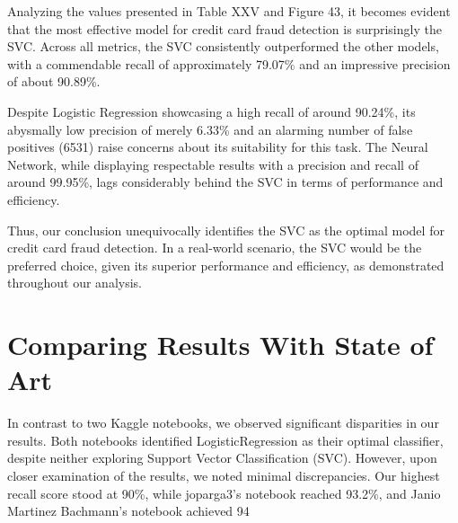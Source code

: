 \documentclass[conference]{IEEEtran}
\begin{document}
\begin{table}[H]
\centering
{}
\caption{Final Results}
\label{tab:svm-comparison}
\end{table}

Analyzing the values presented in Table XXV and Figure 43, it becomes evident that the most effective model for credit card fraud detection is surprisingly the SVC. Across all metrics, the SVC consistently outperformed the other models, with a commendable recall of approximately 79.07\% and an impressive precision of about 90.89\%. 

Despite Logistic Regression showcasing a high recall of around 90.24\%, its abysmally low precision of merely 6.33\% and an alarming number of false positives (6531) raise concerns about its suitability for this task. The Neural Network, while displaying respectable results with a precision and recall of around 99.95\%, lags considerably behind the SVC in terms of performance and efficiency. 

Thus, our conclusion unequivocally identifies the SVC as the optimal model for credit card fraud detection. In a real-world scenario, the SVC would be the preferred choice, given its superior performance and efficiency, as demonstrated throughout our analysis.

\section{Comparing Results With State of Art}

In contrast to two Kaggle notebooks, we observed significant disparities in our results. Both notebooks identified LogisticRegression as their optimal classifier, despite neither exploring Support Vector Classification (SVC). However, upon closer examination of the results, we noted minimal discrepancies. Our highest recall score stood at 90\%, while joparga3’s notebook reached 93.2\%, and Janio Martinez Bachmann's notebook achieved 94%
\end{document}
